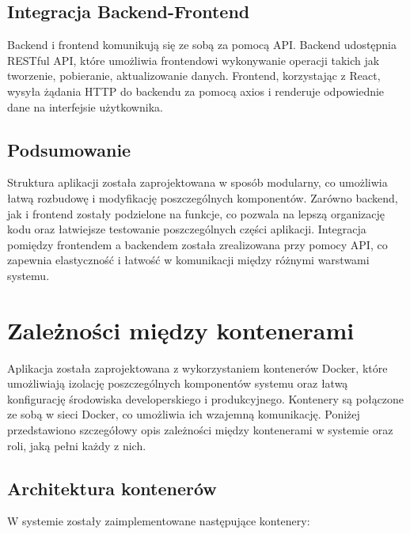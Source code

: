 \subsection{Integracja Backend-Frontend}

Backend i frontend komunikują się ze sobą za pomocą API. Backend udostępnia RESTful API, które umożliwia frontendowi wykonywanie operacji takich jak tworzenie, pobieranie, aktualizowanie danych. Frontend, korzystając z React, wysyła żądania HTTP do backendu za pomocą axios i renderuje odpowiednie dane na interfejsie użytkownika.

\subsection{Podsumowanie}

Struktura aplikacji została zaprojektowana w sposób modularny, co umożliwia łatwą rozbudowę i modyfikację poszczególnych komponentów. Zarówno backend, jak i frontend zostały podzielone na funkcje, co pozwala na lepszą organizację kodu oraz łatwiejsze testowanie poszczególnych części aplikacji. Integracja pomiędzy frontendem a backendem została zrealizowana przy pomocy API, co zapewnia elastyczność i łatwość w komunikacji między różnymi warstwami systemu.


\section{Zależności między kontenerami}

Aplikacja została zaprojektowana z wykorzystaniem kontenerów Docker, które umożliwiają izolację poszczególnych komponentów systemu oraz łatwą konfigurację środowiska developerskiego i produkcyjnego. Kontenery są połączone ze sobą w sieci Docker, co umożliwia ich wzajemną komunikację. Poniżej przedstawiono szczegółowy opis zależności między kontenerami w systemie oraz roli, jaką pełni każdy z nich.

\subsection{Architektura kontenerów}

W systemie zostały zaimplementowane następujące kontenery:

